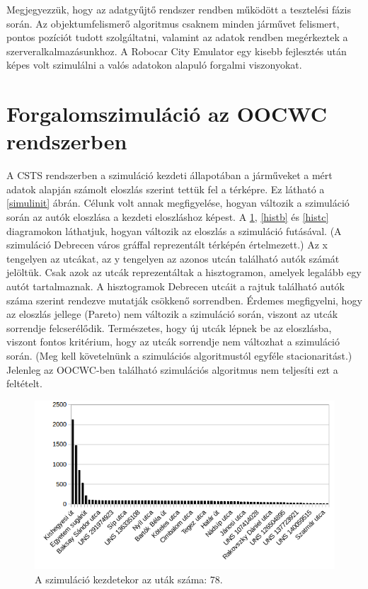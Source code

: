 \documentclass[a4paper,12pt]{report}
\begin{document}
Megjegyezzük, hogy az adatgyűjtő rendszer rendben működött a tesztelési fázis során. Az objektumfelismerő algoritmus csaknem minden járművet felismert, pontos pozíciót tudott szolgáltatni, valamint az adatok rendben megérkeztek a szerveralkalmazásunkhoz. A Robocar City Emulator egy kisebb fejlesztés után képes volt szimulálni a valós adatokon alapuló forgalmi viszonyokat. 

\section{Forgalomszimuláció az OOCWC rendszerben}

A CSTS rendszerben a szimuláció kezdeti állapotában a járműveket a mért adatok alapján számolt eloszlás szerint tettük fel a térképre. Ez látható a \ref{simulinit} ábrán. Célunk volt annak megfigyelése, hogyan változik a szimuláció során az autók eloszlása a kezdeti eloszláshoz képest. A \ref{hista}, \ref{histb} és \ref{histc} diagramokon láthatjuk, hogyan változik az eloszlás a szimuláció futásával. (A szimuláció Debrecen város gráffal reprezentált térképén értelmezett.) Az x tengelyen az utcákat, az y tengelyen az azonos utcán található autók számát jelöltük. Csak azok az utcák reprezentáltak a hisztogramon, amelyek legalább egy autót tartalmaznak. A hisztogramok Debrecen utcáit a rajtuk található autók száma szerint rendezve mutatják csökkenő sorrendben. Érdemes megfigyelni, hogy az eloszlás jellege (Pareto) nem változik a szimuláció során, viszont az utcák sorrendje felcserélődik. Természetes, hogy új utcák lépnek be az eloszlásba, viszont fontos kritérium, hogy az utcák sorrendje nem változhat a szimuláció során. (Meg kell követelnünk a szimulációs algoritmustól egyféle stacionaritást.) Jelenleg az OOCWC-ben található szimulációs algoritmus nem teljesíti ezt a feltételt.

\begin{figure}[h]
\centerline{
\includegraphics[scale=.8]{img/a1}}
\caption{A szimuláció kezdetekor az uták száma: 78.}
\label{hista}
\end{figure}
\end{document}
